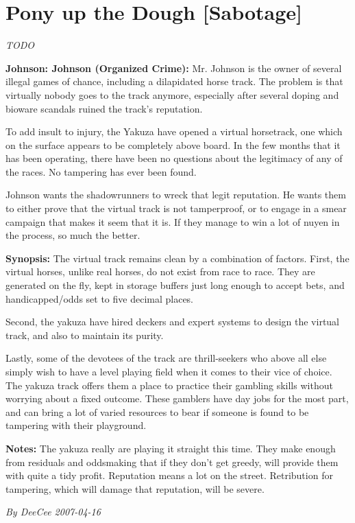 \documentclass[letterpaper,twocolumn,10.5pt]{article}
\newenvironment{scenario}[6]
	{
		\section{#1 {\small[#2]}}
		\textit{#3}
		\def\TMPSCENARIO{#4 #5}
	}
	{\small\textit{By \TMPSCENARIO}}
\newcommand{\johnson}[2]{\textbf{Johnson: #1 (#2):}}
\newcommand{\synopsis}{\textbf{Synopsis: }}
\newcommand{\notes}{\textbf{Notes: }}
\begin{document}
\begin{scenario}{Pony up the Dough}
	{Sabotage}
	{TODO}
	{DeeCee}
	{2007-04-16}
	{https://forum.rpg.net/showthread.php?321504-Shadowrun-4th-101-Instant-Scenarios\&p=7175534#post7175534}

\johnson{Johnson}{Organized Crime} 
Mr. Johnson is the owner of several illegal games of chance, including a dilapidated horse track. The problem is that virtually nobody goes to the track anymore, especially after several doping and bioware scandals ruined the track's reputation.

To add insult to injury, the Yakuza have opened a virtual horsetrack, one which on the surface appears to be completely above board. In the few months that it has been operating, there have been no questions about the legitimacy of any of the races. No tampering has ever been found.

Johnson wants the shadowrunners to wreck that legit reputation. He wants them to either prove that the virtual track is not tamperproof, or to engage in a smear campaign that makes it seem that it is. If they manage to win a lot of nuyen in the process, so much the better.

\synopsis The virtual track remains clean by a combination of factors. First, the virtual horses, unlike real horses, do not exist from race to race. They are generated on the fly, kept in storage buffers just long enough to accept bets, and handicapped/odds set to five decimal places.

Second, the yakuza have hired deckers and expert systems to design the virtual track, and also to maintain its purity.

Lastly, some of the devotees of the track are thrill-seekers who above all else simply wish to have a level playing field when it comes to their vice of choice. The yakuza track offers them a place to practice their gambling skills without worrying about a fixed outcome. These gamblers have day jobs for the most part, and can bring a lot of varied resources to bear if someone is found to be tampering with their playground.

\notes The yakuza really are playing it straight this time. They make enough from residuals and oddsmaking that if they don't get greedy, will provide them with quite a tidy profit. Reputation means a lot on the street. Retribution for tampering, which will damage that reputation, will be severe. 

\end{scenario}
\end{document}
